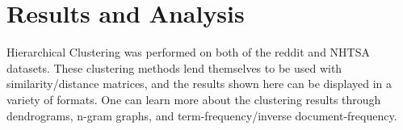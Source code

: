 \chapter{Results and Analysis}


\hspace*{0.3cm} Hierarchical Clustering was performed on both of the reddit and NHTSA datasets. These clustering methods lend themselves to be used with similarity/distance matrices, and the results shown here can be displayed in a variety of formats. One can learn more about the clustering results through dendrograms, n-gram graphs, and term-frequency/inverse document-frequency.


